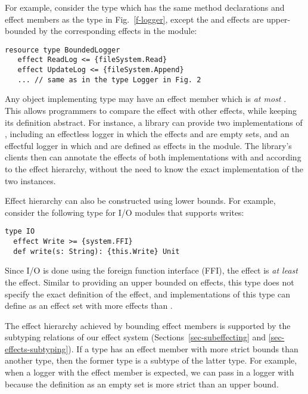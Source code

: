 For example, consider the type  which has the same method declarations and effect members as the type  in Fig.~\ref{f-logger}, except the  and  effects are upper-bounded by the corresponding effects in the  module:

\begin{minipage}{\linewidth}
\begin{lstlisting}[xleftmargin=-5pt, numbers=none]
resource type BoundedLogger
   effect ReadLog <= {fileSystem.Read}
   effect UpdateLog <= {fileSystem.Append}
   ... // same as in the type Logger in Fig. 2
\end{lstlisting}
\end{minipage}
Any object implementing type  may have an effect member  which is \textit{at most} . This allows programmers to compare the  effect with other effects, while keeping its definition abstract. For instance, a library can provide two implementations of , including an effectless logger in which the effects  and  are empty sets, and an effectful logger in which  and  are defined as effects in the  module. The library's clients then can annotate the effects of both implementations with  and  according to the effect hierarchy, without the need to know the exact implementation of the two instances.

Effect hierarchy can also be constructed using lower bounds. For example, consider the following type for I/O modules that supports writes:

\begin{minipage}{\linewidth}
\begin{lstlisting}[xleftmargin=-5pt, numbers=none]
type IO
  effect Write >= {system.FFI}
  def write(s: String): {this.Write} Unit
\end{lstlisting}
\end{minipage}
Since I/O is done using the foreign function interface (FFI), the  effect is \textit{at least} the  effect. Similar to providing an upper bounded on effects, this type does not specify the exact definition of the  effect, and implementations of this type can define  as an effect set with more effects than .

The effect hierarchy achieved by bounding effect members is supported by the subtyping relations of our effect system (Sections~\ref{sec-subeffecting} and \ref{sec-effects-subtyping}). If a type has an effect member with more strict bounds than another type, then the former type is a subtype of the latter type. For example, when a logger with the effect member  is expected, we can pass in a logger with  because the definition as an empty set is more strict than an upper bound.

